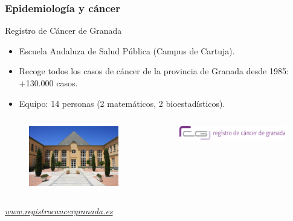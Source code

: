 \documentclass{beamer}
\begin{document}
\begin{frame}\frametitle{Epidemiología y cáncer}
	\begin{block}{Registro de Cáncer de Granada}
		\begin{itemize}
			\item Escuela Andaluza de Salud Pública (Campus de Cartuja).
			\item Recoge todos los casos de cáncer de la provincia de Granada desde 1985: +130.000 casos.
			\item Equipo: 14 personas (2 matemáticos, 2 bioestadísticos).
		\end{itemize}
		
	\vspace{-10pt}	
	\begin{columns}
		\begin{column}{.5\textwidth}
		\begin{figure}
			\centering
			\includegraphics[width=.9\textwidth]{images/registro.jpg}
		\end{figure}
		\end{column}
		\begin{column}{.5\textwidth}
			\begin{figure}
				\centering
			\includegraphics[width=.9\textwidth]{logos/logo_rcg.png}
			\end{figure}
		\end{column}
	\end{columns}
	
	\vspace{5pt}
	\centering
	\textit{\url{www.registrocancergranada.es}}
	\end{block}
\end{frame}
\end{document}
